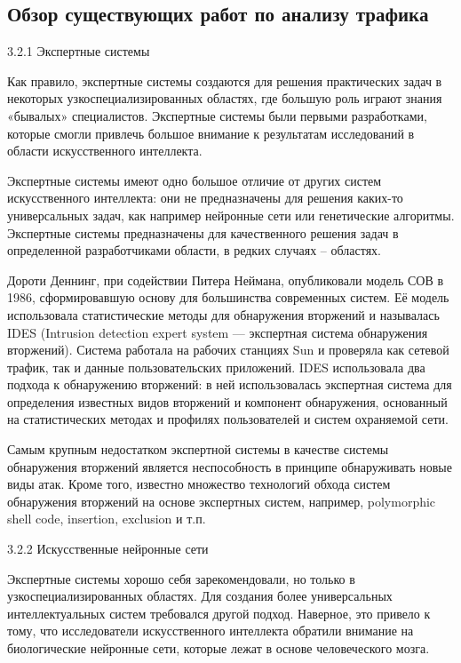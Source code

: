 \subsection{Обзор существующих работ по анализу трафика}

3.2.1  Экспертные системы\par 

Как правило, экспертные системы создаются для решения практических задач в некоторых узкоспециализированных областях, где большую роль играют знания «бывалых» специалистов. Экспертные системы были первыми разработками, которые смогли привлечь большое внимание к результатам исследований в области искусственного интеллекта.\par 

Экспертные системы имеют одно большое отличие от других систем искусственного интеллекта: они не предназначены для решения каких-то универсальных задач, как например нейронные сети или генетические алгоритмы. Экспертные системы предназначены для качественного решения задач в определенной разработчиками области, в редких случаях – областях.\par 

Дороти Деннинг, при содействии Питера Неймана, опубликовали модель СОВ в 1986, сформировавшую основу для большинства современных систем. Её модель использовала статистические методы для обнаружения вторжений и называлась IDES (Intrusion detection expert system — экспертная система обнаружения вторжений). Система работала на рабочих станциях Sun и проверяла как сетевой трафик, так и данные пользовательских приложений. IDES использовала два подхода к обнаружению вторжений: в ней использовалась экспертная система для определения известных видов вторжений и компонент обнаружения, основанный на статистических методах и профилях пользователей и систем охраняемой сети.\par 

Самым крупным недостатком экспертной системы в качестве системы обнаружения вторжений является неспособность в принципе обнаруживать новые виды атак. Кроме того, известно множество технологий обхода систем обнаружения вторжений на основе экспертных систем, например, polymorphic shell code, insertion, exclusion и т.п.\par 

3.2.2  Искусственные нейронные сети\par 

Экспертные системы хорошо себя зарекомендовали, но только в узкоспециализированных областях. Для создания более универсальных интеллектуальных систем требовался другой подход. Наверное, это привело к тому, что исследователи искусственного интеллекта обратили внимание на биологические нейронные сети, которые лежат в основе человеческого мозга.\par 

